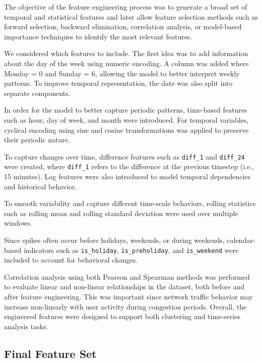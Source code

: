 \documentclass[conference]{IEEEtran}
\begin{document}
The objective of the feature engineering process was to generate a broad set of temporal and statistical features and later allow feature selection methods such as forward selection, backward elimination, correlation analysis, or model-based importance techniques to identify the most relevant features.

We considered which features to include. The first idea was to add information about the day of the week using numeric encoding. A column was added where Monday = 0 and Sunday = 6, allowing the model to better interpret weekly patterns. To improve temporal representation, the date was also split into separate components.

In order for the model to better capture periodic patterns, time-based features such as hour, day of week, and month were introduced. For temporal variables, cyclical encoding using sine and cosine transformations was applied to preserve their periodic nature. 

To capture changes over time, difference features such as \texttt{diff\_1} and \texttt{diff\_24} were created, where \texttt{diff\_1} refers to the difference at the previous timestep (i.e., 15 minutes). Lag features were also introduced to model temporal dependencies and historical behavior.

To smooth variability and capture different time-scale behaviors, rolling statistics such as rolling mean and rolling standard deviation were used over multiple windows.

Since spikes often occur before holidays, weekends, or during weekends, calendar-based indicators such as \texttt{is\_holiday}, \texttt{is\_preholiday}, and \texttt{is\_weekend} were included to account for behavioral changes.

Correlation analysis using both Pearson and Spearman methods was performed to evaluate linear and non-linear relationships in the dataset, both before and after feature engineering. This was important since network traffic behavior may increase non-linearly with user activity during congestion periods. Overall, the engineered features were designed to support both clustering and time-series analysis tasks.

\subsection{Final Feature Set}
\end{document}
